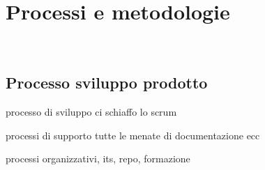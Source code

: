 \chapter{Processi e metodologie}
\label{cap:processi-metodologie}

\\

\section{Processo sviluppo prodotto}

processo di sviluppo ci schiaffo lo scrum

processi di supporto tutte le menate di documentazione ecc

processi organizzativi, its, repo, formazione